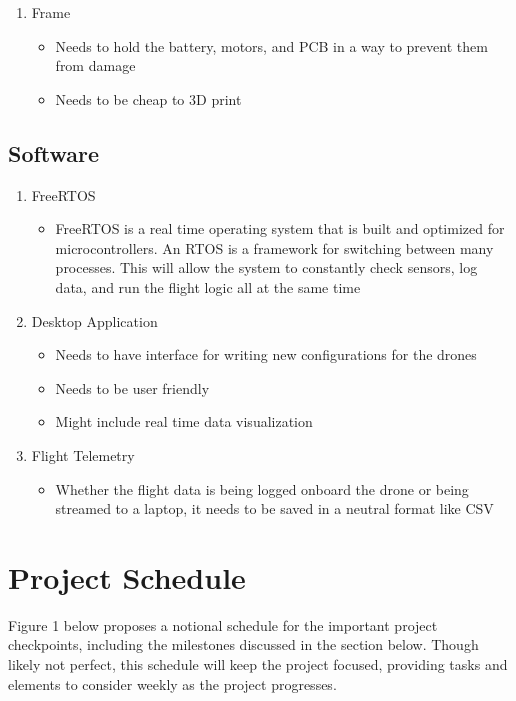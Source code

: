 \documentclass[12pt, titlepage]{article}
\begin{document}
\begin{enumerate}
\item Frame
\begin{itemize}
\item Needs to hold the battery, motors, and PCB in a way to prevent them from damage
\item Needs to be cheap to 3D print
\end{itemize}
 

\end{enumerate}


\subsection{Software}
\begin{enumerate}
\item FreeRTOS
\begin{itemize}
\item FreeRTOS is a real time operating system that is built and optimized for microcontrollers. An RTOS is a framework for switching between many processes. This will allow the system to constantly check sensors, log data, and run the flight logic all at the same time
\end{itemize}

\item Desktop Application
\begin{itemize}
\item Needs to have interface for writing new configurations for the drones
\item Needs to be user friendly
\item Might include real time data visualization
\end{itemize}

\item Flight Telemetry 
\begin{itemize}
\item Whether the flight data is being logged onboard the drone or being streamed to a laptop, it needs to be saved in a neutral format like CSV
\end{itemize}
\end{enumerate}

\section{Project Schedule}
Figure 1 below proposes a notional schedule for the important project checkpoints, including the milestones discussed in the section below. Though likely not perfect, this schedule will keep the project focused, providing tasks and elements to consider weekly as the project progresses.
\end{document}
